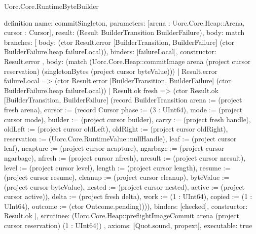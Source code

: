 \begin{lexlean}{Uorc.Core.RuntimeByteBuilder}
\begin{semanticmodule}
definition{
  name: commitSingleton,
  parameters: [arena : Uorc.Core.Heap::Arena, cursor : Cursor],
  result: (Result BuilderTransition BuilderFailure),
  body: match{
    branches: [
      {
        body: (ctor Result.error [BuilderTransition, BuilderFailure] (ctor BuilderFailure.heap failureLocal)),
        binders: [failureLocal],
        constructor: Result.error
      },
      {
        body: (match (Uorc.Core.Heap::commitImage arena (project cursor reservation) (singletonBytes (project cursor byteValue)))
          | Result.error failureLocal => (ctor Result.error [BuilderTransition, BuilderFailure] (ctor BuilderFailure.heap failureLocal))
          | Result.ok fresh => (ctor Result.ok [BuilderTransition, BuilderFailure] (record BuilderTransition {arena := (project fresh arena), cursor := (record Cursor {phase := (3 : UInt64), mode := (project cursor mode), builder := (project cursor builder), carry := (project fresh handle), oldLeft := (project cursor oldLeft), oldRight := (project cursor oldRight), reservation := (Uorc.Core.RuntimeValue::nullHandle), leaf := (project cursor leaf), ncapture := (project cursor ncapture), ngarbage := (project cursor ngarbage), nfresh := (project cursor nfresh), nresult := (project cursor nresult), level := (project cursor level), length := (project cursor length), resume := (project cursor resume), cleanup := (project cursor cleanup), byteValue := (project cursor byteValue), nested := (project cursor nested), active := (project cursor active)}), delta := (project fresh delta), work := (1 : UInt64), copied := (1 : UInt64), outcome := (ctor Outcome.pending)}))),
        binders: [checked],
        constructor: Result.ok
      }
    ],
    scrutinee: (Uorc.Core.Heap::preflightImageCommit arena (project cursor reservation) (1 : UInt64))
  },
  axioms: [Quot.sound, propext],
  executable: true
}


\end{semanticmodule}
\end{lexlean}
